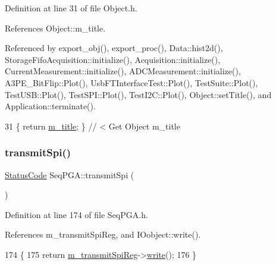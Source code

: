 Definition at line 31 of file Object.\+h.



References Object\+::m\+\_\+title.



Referenced by export\+\_\+obj(), export\+\_\+proc(), Data\+::hist2d(), Storage\+Fifo\+Acquisition\+::initialize(), Acquisition\+::initialize(), Current\+Measurement\+::initialize(), A\+D\+C\+Measurement\+::initialize(), A3\+P\+E\+\_\+\+Bit\+Flip\+::\+Plot(), Usb\+F\+T\+Interface\+Test\+::\+Plot(), Test\+Suite\+::\+Plot(), Test\+U\+S\+B\+::\+Plot(), Test\+S\+P\+I\+::\+Plot(), Test\+I2\+C\+::\+Plot(), Object\+::set\+Title(), and Application\+::terminate().


\begin{DoxyCode}
31 \{ \textcolor{keywordflow}{return} \hyperlink{classObject_affbeea1953eb5163573b92fad8f75727}{m\_title};      \} \textcolor{comment}{// < Get Object m\_title}
\end{DoxyCode}
\mbox{\label{classSeqPGA_a579b4ab222e1c4778640948fbf2a8805}} 
\subsubsection{\texorpdfstring{transmit\+Spi()}{transmitSpi()}}
{\footnotesize\ttfamily \hyperlink{classStatusCode}{Status\+Code} Seq\+P\+G\+A\+::transmit\+Spi (\begin{DoxyParamCaption}{ }\end{DoxyParamCaption})\hspace{0.3cm}{\ttfamily [inline]}}



Definition at line 174 of file Seq\+P\+G\+A.\+h.



References m\+\_\+transmit\+Spi\+Reg, and I\+Oobject\+::write().


\begin{DoxyCode}
174                            \{
175     \textcolor{keywordflow}{return} \hyperlink{classSeqPGA_a4e0ffb37b1cd947d389354ac25723ab8}{m\_transmitSpiReg}->\hyperlink{classIOobject_a9f6984bc9f0fadcf800f1be2523ac744}{write}();
176   \}
\end{DoxyCode}
\mbox{\label{classHierarchy_a76e914b9a677a22a82deb74d892bf261}} 
